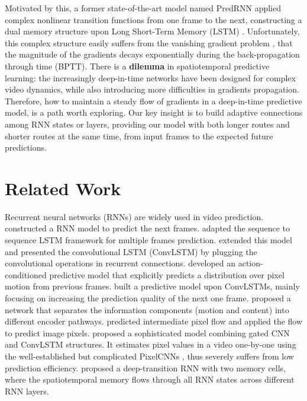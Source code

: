\documentclass{article}
\begin{document}
Motivated by this, a former state-of-the-art model named PredRNN \cite{wang2017predrnn} applied complex nonlinear transition functions from one frame to the next, constructing a dual memory structure upon Long Short-Term Memory (LSTM) \cite{hochreiter1997long}. Unfortunately, this complex structure easily suffers from the vanishing gradient problem \cite{bengio1994learning,Gustavsson2012On}, that the magnitude of the gradients decays exponentially during the back-propagation through time (BPTT). There is a \textbf{dilemma} in spatiotemporal predictive learning: the increasingly deep-in-time networks have been designed for complex video dynamics, while also introducing more difficulties in gradients propagation. Therefore, how to maintain a steady flow of gradients in a deep-in-time predictive model, is a path worth exploring. Our key insight is to build adaptive connections among RNN states or layers, providing our model with both longer routes and shorter routes at the same time, from input frames to the expected future predictions.





\section{Related Work} 


Recurrent neural networks (RNNs) are widely used in video prediction.
\citet{Ranzato2014Video} constructed a RNN model to predict the next frames.
\citet{srivastava2015unsupervised} adapted the sequence to sequence LSTM framework for multiple frames prediction.
\citet{shi2015convolutional} extended this model and presented the convolutional LSTM (ConvLSTM) by plugging the convolutional operations in recurrent connections.
\citet{Finn2016Unsupervised} developed an action-conditioned predictive model that explicitly predicts a distribution over pixel motion from previous frames.
\citet{Lotter2016Deep} built a predictive model upon ConvLSTMs, mainly focusing on increasing the prediction quality of the next one frame.
\citet{Villegas2017Decomposing} proposed a network that separates the information components (motion and content) into different encoder pathways.
\citet{patraucean2015spatio} predicted intermediate pixel flow and applied the flow to predict image pixels.
\citet{Kalchbrenner2016Video} proposed a sophisticated model combining gated CNN and ConvLSTM structures. It estimates pixel values in a video one-by-one using the well-established but complicated PixelCNNs \cite{van2016conditional}, thus severely suffers from low prediction efficiency.
\citet{wang2017predrnn} proposed a deep-transition RNN with two memory cells, where the spatiotemporal memory flows through all RNN states across different RNN layers. 
\end{document}
